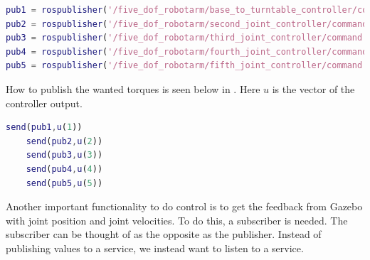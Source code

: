 \begin{lstlisting}[language=Matlab,caption={MATLAB code for creating the publishers.},label={lst:matlabPubl}]
pub1 = rospublisher('/five_dof_robotarm/base_to_turntable_controller/command','std_msgs/Float64');
pub2 = rospublisher('/five_dof_robotarm/second_joint_controller/command','std_msgs/Float64');
pub3 = rospublisher('/five_dof_robotarm/third_joint_controller/command','std_msgs/Float64');
pub4 = rospublisher('/five_dof_robotarm/fourth_joint_controller/command','std_msgs/Float64');
pub5 = rospublisher('/five_dof_robotarm/fifth_joint_controller/command','std_msgs/Float64');
\end{lstlisting}

How to publish the wanted torques is seen below in . Here $u$ is the vector of the controller output. 
\begin{lstlisting}[language=Matlab,caption={MATLAB code for publish wanted joint torques},label={lst:matlabPubs}]
    send(pub1,u(1))
    send(pub2,u(2))
    send(pub3,u(3))
    send(pub4,u(4))
    send(pub5,u(5))
\end{lstlisting}

Another important functionality to do control is to get the feedback from Gazebo with joint position and joint velocities. To do this, a subscriber is needed. The subscriber can be thought of as the opposite as the publisher. Instead of publishing values to a service, we instead want to listen to a service. 


